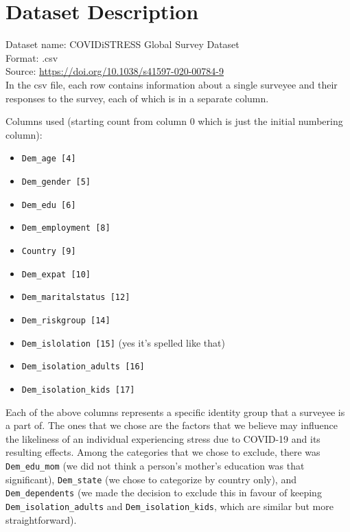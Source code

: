 \documentclass[fontsize=11pt]{article}
\begin{document}
    \section*{Dataset Description}

    Dataset name: COVIDiSTRESS Global Survey Dataset \\
    Format: .csv \\
    Source: \url{https://doi.org/10.1038/s41597-020-00784-9} \\

    In the csv file, each row contains information about a single surveyee and their responses to the survey, each of which is in a separate column.

    Columns used (starting count from column 0 which is just the initial numbering column):
    \begin{itemize}
        \item \texttt{Dem\_age [4]}
        \item \texttt{Dem\_gender [5]}
        \item \texttt{Dem\_edu [6]}
        \item \texttt{Dem\_employment [8]}
        \item \texttt{Country [9]}
        \item \texttt{Dem\_expat [10]}
        \item \texttt{Dem\_maritalstatus [12]}
        \item \texttt{Dem\_riskgroup [14]}
        \item \texttt{Dem\_islolation [15]}  (yes it's spelled like that)
        \item \texttt{Dem\_isolation\_adults [16]}
        \item \texttt{Dem\_isolation\_kids [17]}
    \end{itemize}

    Each of the above columns represents a specific identity group that a surveyee is a part of. The ones that we chose are the factors that we believe may influence the likeliness of an individual experiencing stress due to COVID-19 and its resulting effects. Among the categories that we chose to exclude, there was \texttt{Dem\_edu\_mom} (we did not think a person’s mother’s education was that significant), \texttt{Dem\_state} (we chose to categorize by country only), and \texttt{Dem\_dependents} (we made the decision to exclude this in favour of keeping \texttt{Dem\_isolation\_adults} and \texttt{Dem\_isolation\_kids}, which are similar but more straightforward).
\end{document}
